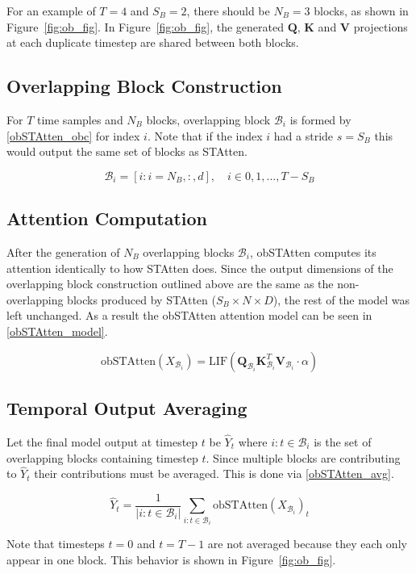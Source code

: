 \documentclass[../main.tex]{subfiles}
\begin{document}
\par For an example of $T=4$ and $S_B=2$, there should be $N_B=3$ blocks, as shown in Figure~\ref{fig:ob_fig}. In Figure~\ref{fig:ob_fig}, the generated $\mathbf{Q}$, $\mathbf{K}$ and $\mathbf{V}$ projections at each duplicate timestep are shared between both blocks.

\subsection{Overlapping Block Construction}
For $T$ time samples and $N_B$ blocks, overlapping block $\mathcal{B}_i$ is formed by \eqref{obSTAtten_obc} for index $i$. Note that if the index $i$ had a stride $s=S_B$ this would output the same set of blocks as STAtten.

\begin{equation}\label{obSTAtten_obc}
\mathcal{B}_i=[i:i=N_B,:,d],\quad i\in{0,1,...,T-S_B}
\end{equation}

\subsection{Attention Computation}
\label{sec:attn}
After the generation of $N_B$ overlapping blocks $\mathcal{B}_i$, obSTAtten computes its attention identically to how STAtten does. Since the output dimensions of the overlapping block construction outlined above are the same as the non-overlapping blocks produced by STAtten ($S_B\times N\times D$), the rest of the model was left unchanged. As a result the obSTAtten attention model can be seen in \eqref{obSTAtten_model}.

\begin{equation}\label{obSTAtten_model}
\text{obSTAtten}(X_{\mathcal{B}_i})=\text{LIF}(\mathbf{Q}_{\mathcal{B}_i}\mathbf{K}^T_{\mathcal{B}_i}\mathbf{V}_{\mathcal{B}_i}\cdot\alpha)
\end{equation}

\subsection{Temporal Output Averaging}
Let the final model output at timestep $t$ be $\hat{Y}_t$ where ${i:t\in \mathcal{B}_i}$ is the set of overlapping blocks containing timestep $t$. Since multiple blocks are contributing to $\hat{Y}_t$ their contributions must be averaged. This is done via \eqref{obSTAtten_avg}.

\begin{equation}\label{obSTAtten_avg}
\hat{Y}_t=\frac{1}{|{i:t\in \mathcal{B}_i}|}\sum_{i:t\in \mathcal{B}_i}\text{obSTAtten}(X_{\mathcal{B}_i})_t
\end{equation}

\noindent Note that timesteps $t=0$ and $t=T-1$ are not averaged because they each only appear in one block. This behavior is shown in Figure~\ref{fig:ob_fig}.
\end{document}
